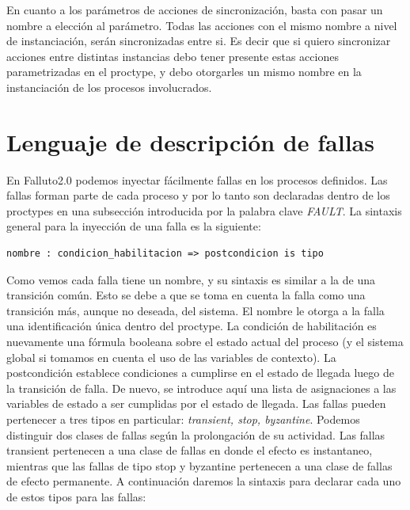 \documentclass[titlepage, 12pt]{book}
\begin{document}
En cuanto a los parámetros de acciones de sincronización, basta con pasar un nombre a elección al parámetro. Todas las acciones con el mismo nombre a nivel de instanciación, serán sincronizadas entre si. Es decir que si quiero sincronizar acciones entre distintas instancias debo tener presente estas acciones parametrizadas en el proctype, y debo otorgarles un mismo nombre en la instanciación de los procesos involucrados.

\section{Lenguaje de descripci\'on de fallas}
En Falluto2.0 podemos inyectar f\'acilmente fallas en los procesos definidos. Las fallas forman parte de cada proceso y por lo tanto son declaradas dentro de los proctypes en una subsecci\'on introducida por la palabra clave \textit{FAULT}. La sintaxis general para la inyecci\'on de una falla es la siguiente: \begin{verbatim}nombre : condicion_habilitacion => postcondicion is tipo\end{verbatim}
Como vemos cada falla tiene un nombre, y su sintaxis es similar a la de una transici\'on com\'un. Esto se debe a que se toma en cuenta la falla como una transici\'on m\'as, aunque no deseada, del sistema. El nombre le otorga a la falla una identificaci\'on \'unica dentro del proctype. La condici\'on de habilitaci\'on es nuevamente una f\'ormula booleana sobre el estado actual del proceso (y el sistema global si tomamos en cuenta el uso de las variables de contexto). La postcondici\'on establece condiciones a cumplirse en el estado de llegada luego de la transici\'on de falla. De nuevo, se introduce aqu\'i una lista de asignaciones a las variables de estado a ser cumplidas por el estado de llegada. Las fallas pueden pertenecer a tres tipos en particular: \textit{transient, stop, byzantine}. Podemos distinguir dos clases de fallas seg\'un la prolongaci\'on de su actividad. Las fallas transient pertenecen a una clase de fallas en donde el efecto es instantaneo, mientras que las fallas de tipo stop y byzantine pertenecen a una clase de fallas de efecto permanente. A continuaci\'on daremos la sintaxis para declarar cada uno de estos tipos para las fallas:\\
\end{document}
